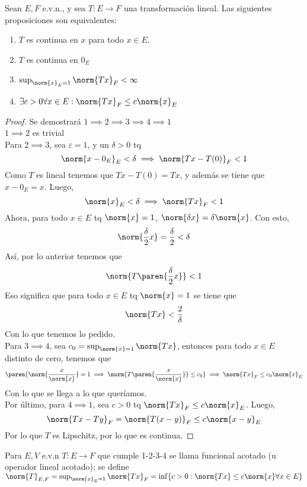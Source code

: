 \documentclass{notetaking}
\begin{document}
\begin{thm}
    Sean \(E,F\) e.v.n., y sea \(T:E\rightarrow F\) una transformación lineal. Las siguientes proposiciones son equivalentes:
    \begin{enumerate}
        \item \(T\) es continua en \(x\) para todo \(x\in E\).
        \item \(T\) es continua en \(0_E\)
        \item \(\sup_{\norm{x}_E=1}\norm{Tx}_F<\infty\)
        \item \(\exists c>0\forall x\in E:\norm{Tx}_F\leq c\norm{x}_E\)
    \end{enumerate}
\end{thm}

\begin{proof}
    Se demostrará \(1\implies 2\implies 3\implies 4\implies 1\)\\
    \(1\implies 2\) es trivial\\
    Para \(2\implies 3\), sea \(\varepsilon=1\), y un \(\delta>0\) tq
    \[
        \norm{x-0_E}_E<\delta\implies\norm{Tx-T(0)}_F<1
    \]
    Como \(T\) es lineal tenemos que \(Tx-T(0)=Tx\), y además se tiene que \(x-0_E=x\). Luego,
    \[
        \norm{x}_E<\delta\implies\norm{Tx}_F<1
    \]
    Ahora, para todo \(x\in E\) tq \(\norm{x}=1\), \(\norm{\delta x}=\delta\norm{x}\). Con esto,
    \[
        \norm{\frac\delta2x}=\frac\delta2<\delta
    \]
    Así, por lo anterior tenemos que
    \[
        \norm{T\paren{\frac\delta2x}}<1
    \]
    Eso significa que para todo \(x\in E\) tq \(\norm{x}=1\) se tiene que
    \[
        \norm{Tx}<\frac2\delta
    \]
    Con lo que tenemos lo pedido.\\
    Para \(3\implies 4\), sea \(c_0=\sup_{\norm{x}=1}\norm{Tx}\), entonces para todo \(x\in E\) distinto de cero, tenemos que
    \[
        \paren{\norm{\frac{x}{\norm{x}}}=1\implies\norm{T\paren{\frac{x}{\norm{x}}}}\leq c_0}\implies \norm{Tx}_F\leq c_0\norm{x}_E
    \]
    Con lo que se llega a lo que queríamos.\\
    Por último, para \(4\implies 1\), sea \(c>0\) tq \(\norm{Tx}_F\leq c\norm{x}_E\). Luego,
    \[
        \norm{Tx-Ty}_F=\norm{T(x-y)}_F\leq c\norm{x-y}_E
    \]
    Por lo que \(T\) es Lipschitz, por lo que es continua.
\end{proof}

\begin{defn}
    Para \(E,V\) e.v.n \(T:E\rightarrow F\) que cumple 1-2-3-4 se llama funcional acotado (u operador lineal acotado); se define \(\norm{T}_{E,F}=\sup_{\norm{x}_E=1}\norm{Tx}_F=\inf\{c>0:\norm{Tx}\leq c\norm{x}\forall x\in E\}\)
\end{defn}
\end{document}
